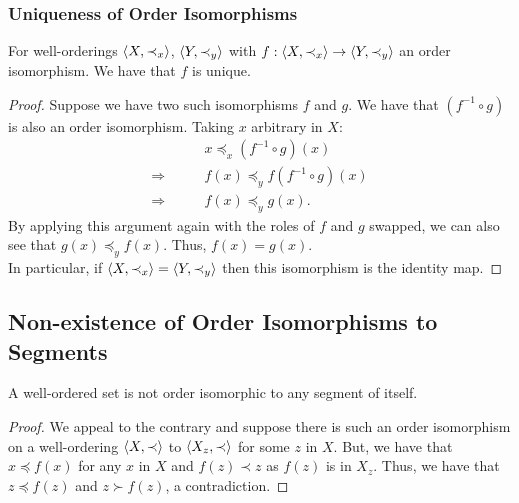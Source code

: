 \subsubsection{Uniqueness of Order Isomorphisms}

For well-orderings $\langle X, \prec_x \rangle$, $\langle Y, \prec_y \rangle$
with $f : \langle X, \prec_x \rangle \to \langle Y, \prec_y \rangle$ an
order isomorphism. We have that $f$ is unique.

\begin{proof}
    Suppose we have two such isomorphisms $f$ and $g$.
    We have that $(f^{-1} \circ g)$ is also an order
    isomorphism. Taking $x$ arbitrary in $X$: \begin{align*}
        &x \preceq_x (f^{-1} \circ g)(x) \\
        \Longrightarrow \qquad & f(x) \preceq_y f(f^{-1} \circ g)(x) \\
        \Longrightarrow \qquad & f(x) \preceq_y g(x).
    \end{align*} By applying this argument again with the roles
    of $f$ and $g$ swapped, we can also see that $g(x) \preceq_y f(x)$.
    Thus, $f(x) = g(x)$.
    \\[\baselineskip]
    In particular, if $\langle X, \prec_x \rangle = \langle Y, \prec_y \rangle$
    then this isomorphism is the identity map.
\end{proof}

\subsection{Non-existence of Order Isomorphisms to Segments}

A well-ordered set is not order isomorphic to any segment of itself.

\begin{proof}
    We appeal to the contrary and suppose there is such
    an order isomorphism on a well-ordering $\langle X, \prec \rangle$
    to $\langle X_z, \prec \rangle$ for some $z$ in $X$.
    But, we have that $x \preceq f(x)$ for any $x$ in $X$
    and $f(z) \prec z$ as $f(z)$ is in $X_z$.
    Thus, we have that $z \preceq f(z)$ and $z \succ f(z)$,
    a contradiction.
\end{proof}

